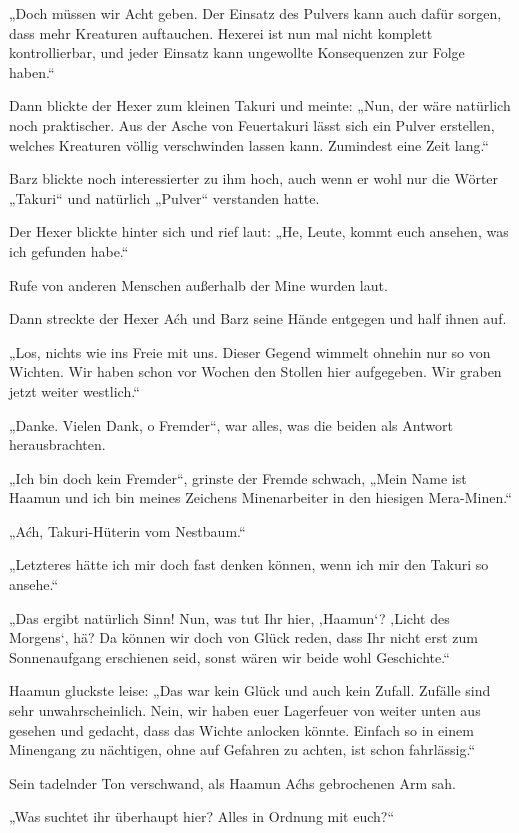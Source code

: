 „Doch müssen wir Acht geben. Der Einsatz des Pulvers kann auch dafür sorgen, dass mehr Kreaturen auftauchen. Hexerei ist nun mal nicht komplett kontrollierbar, und jeder Einsatz kann ungewollte Konsequenzen zur Folge haben.“

Dann blickte der Hexer zum kleinen Takuri und meinte: „Nun, der wäre natürlich noch praktischer. Aus der Asche von Feuertakuri lässt sich ein Pulver erstellen, welches Kreaturen völlig verschwinden lassen kann. Zumindest eine Zeit lang.“

Barz blickte noch interessierter zu ihm hoch, auch wenn er wohl nur die Wörter „Takuri“ und natürlich „Pulver“ verstanden hatte.

Der Hexer blickte hinter sich und rief laut: „He, Leute, kommt euch ansehen, was ich gefunden habe.“

Rufe von anderen Menschen außerhalb der Mine wurden laut.

Dann streckte der Hexer Aćh und Barz seine Hände entgegen und half ihnen auf.

„Los, nichts wie ins Freie mit uns. Dieser Gegend wimmelt ohnehin nur so von Wichten. Wir haben schon vor Wochen den Stollen hier aufgegeben. Wir graben jetzt weiter westlich.“

„Danke. Vielen Dank, o Fremder“, war alles, was die beiden als Antwort herausbrachten.

„Ich bin doch kein Fremder“, grinste der Fremde schwach, „Mein Name ist Haamun und ich bin meines Zeichens Minenarbeiter in den hiesigen Mera-Minen.“

„Aćh, Takuri-Hüterin vom Nestbaum.“

„Letzteres hätte ich mir doch fast denken können, wenn ich mir den Takuri so ansehe.“

„Das ergibt natürlich Sinn! Nun, was tut Ihr hier, ‚Haamun‘? ‚Licht des Morgens‘, hä? Da können wir doch von Glück reden, dass Ihr nicht erst zum Sonnenaufgang erschienen seid, sonst wären wir beide wohl Geschichte.“

Haamun gluckste leise: „Das war kein Glück und auch kein Zufall. Zufälle sind sehr unwahrscheinlich. Nein, wir haben euer Lagerfeuer von weiter unten aus gesehen und gedacht, dass das Wichte anlocken könnte. Einfach so in einem Minengang zu nächtigen, ohne auf Gefahren zu achten, ist schon fahrlässig.“

Sein tadelnder Ton verschwand, als Haamun Aćhs gebrochenen Arm sah.

„Was suchtet ihr überhaupt hier? Alles in Ordnung mit euch?“

